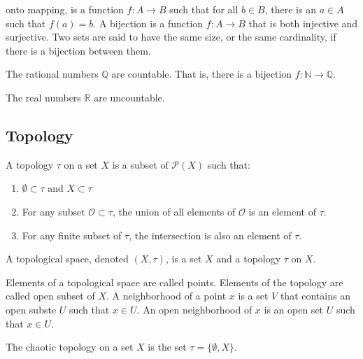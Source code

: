 \documentclass[crop=false,class=article,oneside]{standalone}
\begin{document}
        onto mapping, is a function $f:A\rightarrow{B}$
        such that for all $b\in{B}$, there is an
        $a\in{A}$ such that $f(a)=b$. A bijection is a
        function $f:A\rightarrow{B}$ that is both
        injective and surjective. Two sets are said to
        have the same size, or the same cardinality,
        if there is a bijection between them.
        \begin{theorem}
            The rational numbers $\mathbb{Q}$ are countable.
            That is, there is a bijection
            $f:\mathbb{N}\rightarrow\mathbb{Q}$.
        \end{theorem}
        \begin{theorem}
            The real numbers $\mathbb{R}$ are uncountable.
        \end{theorem}
    \subsection{Topology}
        \begin{definition}
            A topology $\tau$ on a set $X$ is a subset
            of $\mathcal{P}(X)$ such that:
            \begin{enumerate}
                \item $\emptyset\subset\tau$ and $X\subset\tau$
                \item For any subset $\mathcal{O}\subset\tau$, the
                      union of all elements of $\mathcal{O}$ is an
                      element of $\tau$.
                \item For any finite subset of $\tau$, the intersection
                      is also an element of $\tau$.
            \end{enumerate}
        \end{definition}
        \begin{definition}
            A topological space, denoted $(X,\tau)$, is a set
            $X$ and a topology $\tau$ on $X$.
        \end{definition}
        Elements of a topological space are called points.
        Elements of the topology are called open subset of $X$.
        A neighborhood of a point $x$ is a set $V$ that contains
        an open subste $U$ such that $x\in{U}$. An open neighborhood
        of $x$ is an open set $U$ such that $x\in{U}$.
        \begin{example}
            The chaotic topology on a set
            $X$ is the set $\tau=\{\emptyset,X\}$.
        \end{example}
\end{document}
